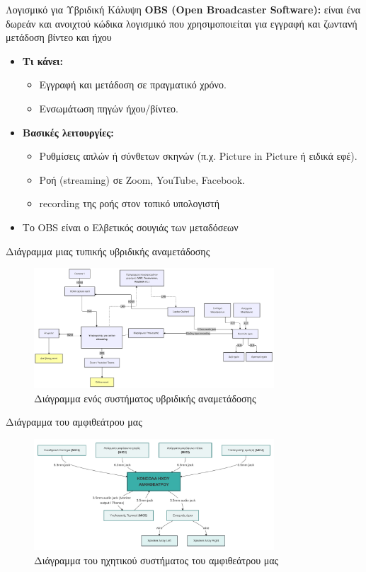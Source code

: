 \documentclass[aspectratio=169]{beamer}
\begin{document}
\begin{frame}{Λογισμικό για Υβριδική Κάλυψη}
  \textbf{OBS (Open Broadcaster Software):}
  είναι ένα δωρεάν και ανοιχτού κώδικα λογισμικό που χρησιμοποιείται για
  εγγραφή και ζωντανή μετάδοση βίντεο και ήχου
  \begin{itemize}
  \item \textbf{Τι κάνει:}
    \begin{itemize}
    \item Εγγραφή και μετάδοση σε πραγματικό χρόνο.
    \item Ενσωμάτωση πηγών ήχου/βίντεο.
    \end{itemize}
  \item \textbf{Βασικές λειτουργίες:}
    \begin{itemize}
    \item Ρυθμίσεις απλών ή σύνθετων σκηνών (π.χ. Picture in Picture ή ειδικά εφέ).
    \item Ροή (streaming) σε Zoom, YouTube, Facebook.
    \item recording της ροής στον τοπικό υπολογιστή
    \end{itemize}
  \item Το OBS είναι ο Ελβετικός σουγιάς των μεταδόσεων
  \end{itemize}
\end{frame}
  \begin{frame}{Διάγραμμα μιας τυπικής υβριδικής αναμετάδοσης}
    \begin{figure}
      \centering
      \includegraphics[width=0.8\textwidth]{images/diagram.png}
      \caption{Διάγραμμα ενός συστήματος υβριδικής αναμετάδοσης}
    \end{figure}
  \end{frame}
  \begin{frame}{Διάγραμμα του αμφιθεάτρου μας}
    \begin{figure}
      \centering
      \includegraphics[width=0.8\textwidth]{images/amfitheatro.pdf}
      \caption{Διάγραμμα του ηχητικού συστήματος του αμφιθεάτρου μας}
    \end{figure}
  \end{frame}
\end{document}
